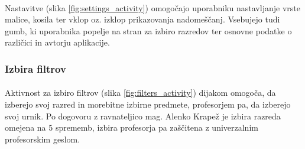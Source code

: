 \paragraph{}Nastavitve (slika \ref{fig:settings_activity}) omogočajo uporabniku nastavljanje vrste malice, kosila ter vklop oz. izklop prikazovanja nadomeščanj. Vsebujejo tudi gumb, ki uporabnika popelje na stran za izbiro razredov ter osnovne podatke o različici in avtorju aplikacije.

\subsubsection{Izbira filtrov}
\paragraph{}Aktivnost za izbiro filtrov (slika \ref{fig:filters_activity}) dijakom omogoča, da izberejo svoj razred in morebitne izbirne predmete, profesorjem pa, da izberejo svoj urnik. Po dogovoru z ravnateljico mag. Alenko Krapež je izbira razreda omejena na 5 sprememb, izbira profesorja pa zaščitena z univerzalnim profesorskim geslom.

